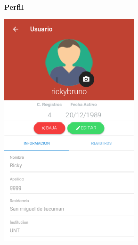 				\begin{figure}
					\hspace*{1cm}\raggedright\large\textbf{Perfil}\par\medskip
					\centering
						\includegraphics[width=0.6\textwidth]{Screenshots/perfil.png}
				\end{figure}
				
